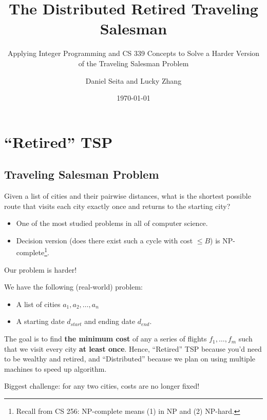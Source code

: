 \documentclass[10pt, xcolor=svgnames]{beamer}
\title[Distributed TSP]{The Distributed Retired Traveling Salesman}
\subtitle{Applying Integer Programming and CS 339 Concepts to Solve a Harder Version of the Traveling Salesman Problem}
\author[Seita and Zhang]{Daniel Seita and Lucky Zhang}
\institute[Williams College]{Department of Computer Science, Williams College}
\date{\today}
\begin{document}
\begin{frame}
	\titlepage
\end{frame}



\section{``Retired'' TSP}

\subsection{Traveling Salesman Problem}

\begin{frame}
\begin{Problem}
Given a list of cities and their pairwise distances, what is the shortest possible route that visits each city exactly once and returns to the
starting city?
\end{Problem}

\begin{itemize}
    \item One of the most studied problems in all of computer science.
    \item Decision version (does there exist such a cycle with cost $\le B$) is NP-complete\footnote{Recall from CS 256: NP-complete means (1) in NP
and (2) NP-hard.}.
\end{itemize}
\end{frame}

\begin{frame}
Our problem is harder!
\begin{Problem}
We have the following (real-world) problem:
\begin{itemize}
    \item A list of cities $a_1, a_2, \ldots, a_n$
    \item A starting date $d_{start}$ and ending date $d_{end}$.
\end{itemize}
The goal is to find \textbf{the minimum cost} of any a series of flights $f_1, \ldots, f_m$ such that we visit every city \textbf{at least once}.
Hence, ``Retired'' TSP because you'd need to be wealthy and retired, and ``Distributed'' because we plan on using multiple machines to speed up
algorithm. 
\end{Problem}
\pause
Biggest challenge: for any two cities, costs are no longer fixed! 
\end{frame}
\end{document}
